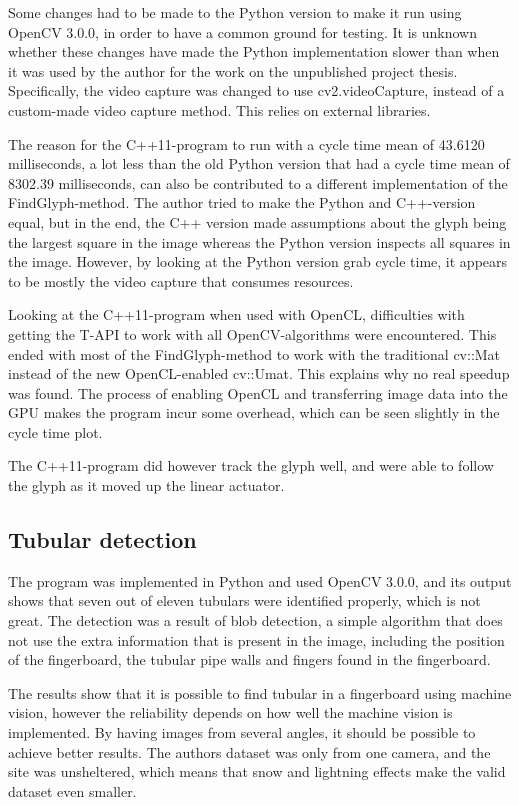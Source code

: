 Some changes had to be made to the Python version to make it run using OpenCV 3.0.0, in order to have a common ground for testing. It is unknown whether these changes have made the Python implementation slower than when it was used by the author for the work on the unpublished project thesis. Specifically, the video capture was changed to use cv2.videoCapture, instead of a custom-made video capture method. This relies on external libraries.

The reason for the C++11-program to run with a cycle time mean of 43.6120 milliseconds, a lot less than the old Python version that had a cycle time mean of 8302.39 milliseconds, can also be contributed to a different implementation of the FindGlyph-method. The author tried to make the Python and C++-version equal, but in the end, the C++ version made assumptions about the glyph being the largest square in the image whereas the Python version inspects all squares in the image. However, by looking at the Python version grab cycle time, it appears to be mostly the video capture that consumes resources.

Looking at the C++11-program when used with OpenCL, difficulties with getting the T-API to work with all OpenCV-algorithms were encountered. This ended with most of the FindGlyph-method to work with the traditional cv::Mat instead of the new OpenCL-enabled cv::Umat. This explains why no real speedup was found. The process of enabling OpenCL and transferring image data into the GPU makes the program incur some overhead, which can be seen slightly in the cycle time plot.

The C++11-program did however track the glyph well, and were able to follow the glyph as it moved up the linear actuator.

\subsection{Tubular detection}
The program was implemented in Python and used OpenCV 3.0.0, and its output shows that seven out of eleven tubulars were identified properly, which is not great. The detection was a result of blob detection, a simple algorithm that does not use the extra information that is present in the image, including the position of the fingerboard, the tubular pipe walls and fingers found in the fingerboard.

The results show that it is possible to find tubular in a fingerboard using machine vision, however the reliability depends on how well the machine vision is implemented. By having images from several angles, it should be possible to achieve better results. The authors dataset was only from one camera, and the site was unsheltered, which means that snow and lightning effects make the valid dataset even smaller.



